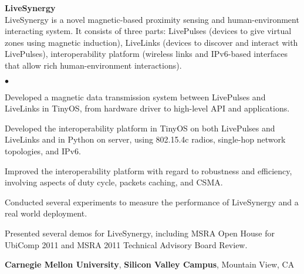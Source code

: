\documentclass[margin,line]{res}
\newenvironment{list1}{
  \begin{list}{\ding{113}}{
      \setlength{\itemsep}{0in}
      \setlength{\parsep}{0in} \setlength{\parskip}{0in}
      \setlength{\topsep}{0in} \setlength{\partopsep}{0in}
      \setlength{\leftmargin}{0.17in}}}{\end{list}}
\newenvironment{list2}{
  \begin{list}{$\bullet$}{
      \setlength{\itemsep}{0in}
      \setlength{\parsep}{0in} \setlength{\parskip}{0in}
      \setlength{\topsep}{0in} \setlength{\partopsep}{0in}
      \setlength{\leftmargin}{0.2in}}}{\end{list}}
\begin{document}
\begin{resume}
      \vspace*{-.1in}
      \begin{list1}
        \item[] {\bf LiveSynergy}\\
        LiveSynergy is a novel magnetic-based proximity sensing and human-environment interacting system. It consists of three parts: LivePulses (devices to give virtual zones using magnetic induction), LiveLinks (devices to discover and interact with LivePulses), interoperability platform (wireless links and IPv6-based interfaces that allow rich human-environment interactions).
        \vspace*{.05in}
        \begin{list2}
          \item Developed a magnetic data transmission system between LivePulses and LiveLinks in TinyOS, from hardware driver to high-level API and applications.
          \item Developed the  interoperability platform in TinyOS on both LivePulses and LiveLinks and in Python on server, using 802.15.4c radios, single-hop network topologies, and IPv6.
          \item Improved the interoperability platform with regard to robustness and efficiency, involving aspects of duty cycle, packets caching, and CSMA.
          \item Conducted several experiments to measure the performance of LiveSynergy and a real world deployment.
          \item Presented several demos for LiveSynergy, including MSRA Open House for UbiComp 2011 and MSRA 2011 Technical Advisory Board Review.
        \end{list2}
      \end{list1}

      {\bf Carnegie Mellon University}, {\bf Silicon Valley Campus}, Mountain View, CA


\end{resume}
\end{document}
